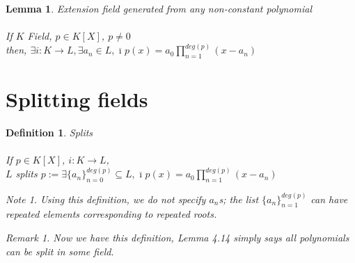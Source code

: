 \documentclass{article}
\theoremstyle{definitionstyle}
\newtheorem{defn}{Definition}[section]
\theoremstyle{lemmastyle}
\newtheorem{lem}{Lemma}[section]
\theoremstyle{remark}
\newtheorem*{note}{Note}
\newtheorem*{remark}{Remark}
\newcommand{\ibar}{\overline{\imath}}
\begin{document}
\begin{lem} Extension field generated from any non-constant polynomial\\
\\
If $K$ Field, $p \in K[X]$, $p \neq 0$\\

then, $\exists i : K \to L, \exists a_n \in L, \ibar p(x) = a_0 \displaystyle \prod_{n=1}^{deg(p)} (x -  a_n)$\end{lem}

\section{Splitting fields}
\begin{defn} Splits\\
\\
If $p \in K[X]$, $i : K \to L$,\\

$L$ splits $p := \exists \{a_n\}_{n=0}^{deg(p)} \subseteq L, \ibar p(x) = a_0 \displaystyle \prod_{n=1}^{deg(p)} (x -  a_n)$
\begin{note} Using this definition, we do not specify $a_n$s; the list $\{a_n\}_{n=1}^{deg(p)}$ can have repeated elements corresponding to repeated roots. \end{note}
\begin{remark} Now we have this definition, Lemma 4.14 simply says all polynomials can be split in some field.\end{remark}\end{defn}

\end{document}
